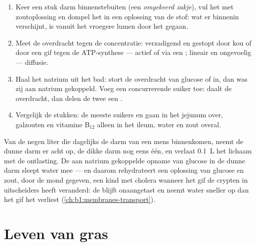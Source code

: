 \begin{method}\label{met:b1:digestion-absorption:everted}
\begin{enumerate}
  \item Keer een stuk darm binnenstebuiten (een \emph{omgekeerd zakje}),
        vul het met zoutoplossing en dompel het in een oplossing van de
        stof: wat er binnenin verschijnt, is vanuit het vroegere lumen
        door het  gegaan.
  \item Meet de overdracht tegen de concentratie: verzadigend en
        gestopt door kou of door een gif tegen de ATP-synthese ---
        actief of via een ; lineair en ongevoelig --- diffusie.
  \item Haal het natrium uit het bad: stort de overdracht van glucose of
         in, dan was zij aan natrium gekoppeld. Voeg een
        concurrerende suiker toe: daalt de overdracht, dan delen de twee
        een .
  \item Vergelijk de stukken: de meeste suikers en  gaan in
        het jejunum over, galzouten en vitamine B$_{12}$ alleen in het
        ileum, water en zout overal.
\end{enumerate}
\end{method}

\begin{example}[De waterbalans]\label{ex:b1:digestion-absorption:water}
Van de negen liter die dagelijks de darm van een mens binnenkomen, neemt de
dunne darm er acht op, de dikke darm nog eens één, en verlaat
\qty{0.1}{L} het lichaam met de ontlasting. De aan natrium gekoppelde
opname van glucose in de dunne darm sleept water mee --- en daarom
rehydrateert een oplossing van glucose en zout, door de mond gegeven, een
kind met cholera wanneer het gif de crypten in uitscheiders heeft
veranderd: de  blijft onaangetast en neemt water sneller op dan
het gif het verliest (\cref{ch:b1:membranes-transport}).
\end{example}

\section{Leven van gras}

